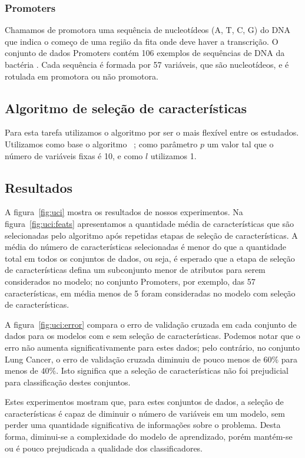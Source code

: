 \subsubsection{Promoters}
Chamamos de promotora uma sequência de nucleotídeos (A, T, C, G) do DNA 
que indica o começo de uma região da fita onde deve haver a transcrição. 
O conjunto de dados Promoters contém 106 exemplos de sequências de DNA 
da bactéria . Cada sequência é formada por 57 
variáveis, que são nucleotídeos, e é rotulada em promotora ou não 
promotora.

\subsection{Algoritmo de seleção de características}
Para esta tarefa utilizamos o algoritmo  por ser o mais
flexível entre os estudados. Utilizamos como base o algoritmo 
~\cite{Whi71}; como 
parâmetro $p$ um valor tal que o número de variáveis fixas é 10, e como 
$l$ utilizamos 1.

\subsection{Resultados}
A figura~\ref{fig:uci} mostra os resultados de nossos experimentos.
Na figura~\ref{fig:uci:feats} apresentamos a quantidade média de 
características que são selecionadas pelo algoritmo  após
repetidas etapas de seleção de características. A média do número de 
características selecionadas é menor do que a quantidade total em todos 
os conjuntos de dados, ou seja, é esperado que a etapa de seleção
de características defina um subconjunto menor de atributos para 
serem considerados no modelo; no conjunto Promoters, por exemplo, das 
57 características, em média menos de 5 foram consideradas no modelo 
com seleção de características.

A figura~\ref{fig:uci:error} compara o erro de validação cruzada em cada
conjunto de dados para os modelos com e sem seleção de características.
Podemos notar que o erro não aumenta significativamente para estes 
dados; pelo contrário, no conjunto Lung Cancer, o erro de validação 
cruzada diminuiu de pouco menos de $60\%$ para menos de $40\%$. Isto
significa que a seleção de características não foi prejudicial para
classificação destes conjuntos.

Estes experimentos mostram que, para estes conjuntos de 
dados, a seleção de características é capaz de diminuir o número de 
variáveis em um modelo, sem perder uma quantidade significativa de 
informações sobre o problema. Desta forma, diminui-se a complexidade do
modelo de aprendizado, porém mantém-se ou é pouco prejudicada a 
qualidade dos classificadores.

